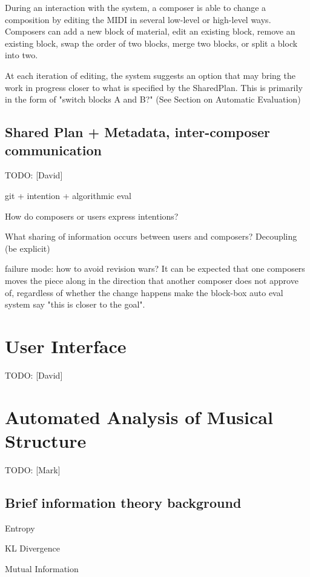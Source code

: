 \documentclass[final,authoryear,11pt,times]{elsarticle}
\begin{document}
During an interaction with the system, a composer is able to change a composition by editing the MIDI in several low-level or high-level ways. Composers can add a new block of material, edit an existing block, remove an existing block, swap the order of two blocks, merge two blocks, or split a block into two.

At each iteration of editing, the system suggests an option that may bring the work in progress closer to what is specified by the SharedPlan. This is primarily in the form of "switch blocks A and B?" (See Section on Automatic Evaluation)

\subsection{Shared Plan + Metadata, inter-composer communication}

TODO: [David]

git + intention + algorithmic eval

How do composers or users express intentions?

What sharing of information occurs between users and composers? Decoupling (be explicit)

failure mode: how to avoid revision wars? It can be expected that one composers moves the piece along in the direction that another composer does not approve of, regardless of whether the change happens make the block-box auto eval system say "this is closer to the goal".

\section{User Interface}

TODO: [David]



\section{Automated Analysis of Musical Structure}

TODO: [Mark]

\subsection{Brief information theory background}

Entropy

KL Divergence

Mutual Information
\end{document}
